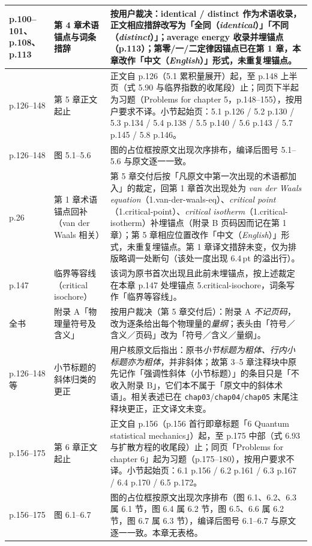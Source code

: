 \documentclass[11pt,a4paper,oneside,fontset=fandol]{ctexart}
\begin{document}
\begin{longtable}{@{}p{3.4cm} p{3.4cm} p{7.4cm}@{}}
  \midrule
  p.100--101、p.108、p.113 & 第 4 章术语锚点与词条措辞 & 按用户裁决：identical / distinct 作为术语收录，正文相应措辞改写为「全同（\textit{identical}）」「不同（\textit{distinct}）」；average energy 收录并埋锚点（p.113）；第零/一/二定律因锚点已在第 1 章，本章改作「中文（\textit{English}）」形式，未重复埋锚点。\\
  \midrule
  p.126--148 & 第 5 章正文起止 & 正文自 p.126（5.1 累积量展开）起，至 p.148 上半页（式 5.90 与临界指数的收尾段）止；同页下半起为习题（Problems for chapter 5，p.148--155），按用户要求不译。小节起始页：5.1 p.126 / 5.2 p.130 / 5.3 p.134 / 5.4 p.138 / 5.5 p.140 / 5.6 p.143 / 5.7 p.145 / 5.8 p.146。\\
  \midrule
  p.126--148 & 图 5.1--5.6 & 图的占位框按原文出现次序排布，编译后图号 5.1--5.6 与原文逐一一致。\\
  \midrule
  p.26 & 第 1 章术语锚点回补（van der Waals 相关） & 第 5 章交付后按「凡原文中第一次出现的术语都加入」的裁定，回第 1 章首次出现处为 \textit{van der Waals equation}（1.van-der-waals-eq）、\textit{critical point}（1.critical-point）、\textit{critical isotherm}（1.critical-isotherm）补埋锚点（附录 B 页码因而记在第 1 章）；第 5 章相应位置改作「中文（\textit{English}）」形式，未重复埋锚点。第 1 章译文措辞未变，仅为排版略调一处断句（该处一度出现 6.4\,pt 的溢出行）。\\
  \midrule
  p.147 & 临界等容线（critical isochore） & 该词为原书首次出现且此前未埋锚点，按上述裁定在本章 p.147 处埋锚点 5.critical-isochore，词条写作「临界等容线」。\\
  \midrule
  全书 & 附录 A「物理量符号及含义」 & 按用户裁决（第 5 章交付后）：附录 A \emph{不记页码}，改为逐条给出每个物理量的\emph{量纲}；表头由「符号／含义／页码」改为「符号／含义／量纲」。\\
  \midrule
  p.126--148 等 & 小节标题的斜体归类的更正 & 用户核原文后指出：原书\emph{小节标题为粗体、行内小标题亦为粗体}，并非斜体；故第 3--5 章注释块中原先记作「强调性斜体（小节标题）」的条目只是「不收入附录 B」，它们本不属于「原文中的斜体术语」。相关表述已在 \texttt{chap03}/\texttt{chap04}/\texttt{chap05} 末尾注释块更正，正文译文未变。\\
  \midrule
  p.156--175 & 第 6 章正文起止 & 正文自 p.156（p.156 首行即章标题「6 Quantum statistical mechanics」）起，至 p.175 中部（式 6.93 与扩散方程的收尾段）止；同页「Problems for chapter 6」起为习题（p.175--180），按用户要求不译。小节起始页：6.1 p.156 / 6.2 p.161 / 6.3 p.167 / 6.4 p.170 / 6.5 p.172。\\
  \midrule
  p.156--175 & 图 6.1--6.7 & 图的占位框按原文出现次序排布（图 6.1、6.2、6.3 属 6.1 节，图 6.4 属 6.2 节，图 6.5、6.6 属 6.2 节，图 6.7 属 6.3 节），编译后图号 6.1--6.7 与原文逐一一致。本章无表格。\\

\end{longtable}
\end{document}
